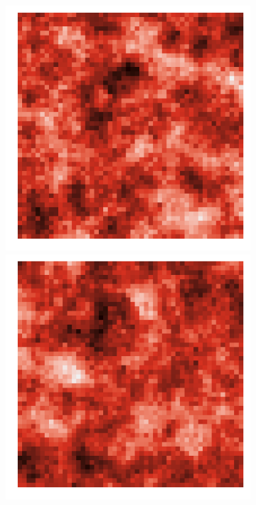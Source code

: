 \documentclass{article}
\begin{document}
\begin{figure}
\begin{subfigure}{0.3\textwidth}
 		\includegraphics[width=\linewidth]{figures/p_realistic2}\\
 		\includegraphics[width=\linewidth]{figures/p_realistic3}\\

\end{subfigure}
\end{figure}
\end{document}
